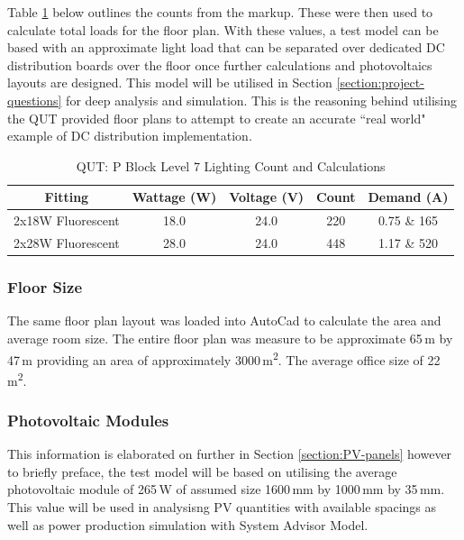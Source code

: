 Table \ref{table:QUTlvl7-count} below outlines the counts from the markup. These were then used to calculate total loads for the floor plan. With these values, a test model can be based with an approximate light load that can be separated over dedicated DC distribution boards over the floor once further calculations and photovoltaics layouts are designed. This model will be utilised in Section \ref{section:project-questions} for deep analysis and simulation. This is the reasoning behind utilising the QUT provided floor plans to attempt to create an accurate ``real world" example of DC distribution implementation.     

\begin{table}[!ht]
	\centering
	\renewcommand{\arraystretch}{2}
	\begin{tabular}{|c|c|c|c|c|}
		\hline
		\textbf{Fitting} & \textbf{Wattage (W)} & \textbf{Voltage (V)} & \textbf{Count} & \textbf{Demand (A)} \\ \hline
		2x18W Fluorescent & 18.0 & 24.0 & 220 & 0.75 \& 165 \\ \hline
		2x28W Fluorescent & 28.0 & 24.0 & 448 & 1.17 \& 520 \\ \hline
	\end{tabular}

	\caption{QUT: P Block Level 7 Lighting Count and Calculations}
	\label{table:QUTlvl7-count}
\end{table}

\subsubsection{Floor Size}

The same floor plan layout was loaded into AutoCad to calculate the area and average room size. The entire floor plan was measure to be approximate 65\,m by 47\,m providing an area of approximately 3000\,\si{m^2}. The average office size of 22\,\si{m^2}. 

\subsubsection{Photovoltaic Modules}

This information is elaborated on further in Section \ref{section:PV-panels} however to briefly preface, the test model will be based on utilising the average photovoltaic module of 265\,W of assumed size 1600\,mm by 1000\,mm by 35\,mm. This value will be used in analysisng PV quantities with available spacings as well as power production simulation with System Advisor Model. 

